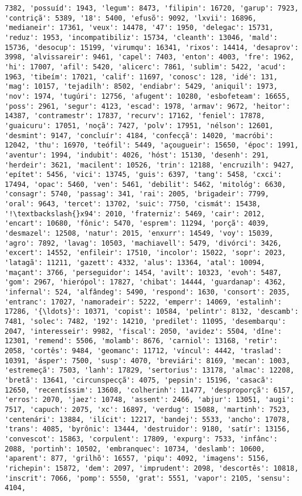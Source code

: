 \begin{Verbatim}[commandchars=\\\{\}]
7382, 'possuíd': 1943, 'legum': 8473, 'filipin': 16720, 'garup': 7923, 'contriçã': 5389, '18': 5400, 'efusõ': 9092, 'lxvii': 16896, 'medianeir': 17361, 'veux': 14478, '47': 1950, 'delegac': 15731, 'reduz': 1953, 'incompatibiliz': 15734, 'cleanth': 13046, 'mald': 15736, 'desocup': 15199, 'virumqu': 16341, 'rixos': 14414, 'desaprov': 3998, 'alvissareir': 9461, 'capel': 7403, 'enton': 4003, 'fre': 1962, 'hi': 17007, 'afil': 5420, 'alicerc': 7861, 'sublim': 5422, 'acud': 1963, 'tibeím': 17021, 'calif': 11697, 'conosc': 128, 'idé': 131, 'mag': 10157, 'tejadilh': 8502, 'endiabr': 5429, 'aniquil': 1973, 'nov': 1974, 'tugúri': 12756, 'afugent': 10280, 'esbofeteam': 16655, 'poss': 2961, 'segur': 4123, 'escad': 1978, 'armav': 9672, 'heitor': 14387, 'contramestr': 17837, 'recurv': 17162, 'feniel': 17878, 'guaicuru': 17051, 'noçã': 7427, 'polv': 17951, 'nélson': 12601, 'desmint': 9147, 'concluír': 4184, 'confecçã': 14020, 'macróbi': 12042, 'thu': 16970, 'teófil': 5449, 'açougueir': 15650, 'époc': 1991, 'aventur': 1994, 'indubit': 4026, 'hóst': 15130, 'desenh': 291, 'herdeir': 3621, 'macilent': 10526, 'trin': 12188, 'encruzilh': 9427, 'epítet': 5456, 'vici': 13745, 'guis': 6397, 'tang': 5458, 'cxci': 17494, 'opac': 5460, 'ven': 5461, 'debilit': 5462, 'mitológ': 6630, 'consagr': 5740, 'passag': 341, 'rai': 2005, 'brigadeir': 7799, 'oral': 9643, 'tercet': 13702, 'suic': 7750, 'cismát': 15438, '!\textbackslash{}x94': 2010, 'fraterniz': 5469, 'cair': 2012, 'encart': 10680, 'fônic': 5470, 'esprem': 11294, 'porçã': 4039, 'desmazel': 12508, 'natur': 2015, 'enxurr': 14549, 'voy': 15039, 'agro': 7892, 'lavag': 10503, 'machiavell': 5479, 'divórci': 3426, 'excert': 14552, 'enfileir': 17510, 'incolor': 15022, 'sopr': 2023, 'latagã': 11211, 'gazett': 4332, 'alus': 13364, 'atal': 10094, 'maçant': 3766, 'perseguidor': 1454, 'avilt': 10323, 'evoh': 5487, 'gom': 2967, 'hierópol': 17827, 'chibat': 14444, 'guardanap': 4362, 'infernal': 524, 'alfândeg': 5490, 'respond': 1630, 'consort': 2035, 'entranc': 17027, 'namoradeir': 5222, 'emperr': 14069, 'estalinh': 17286, '{\ldots}': 10371, 'copist': 10584, 'pelintr': 8132, 'descamb': 7481, 'solec': 7482, '192': 14210, 'predilet': 11095, 'desembarqu': 2047, 'interesseir': 9982, 'fiscal': 2050, 'avidez': 5504, 'dîne': 12301, 'remend': 5506, 'molamb': 8676, 'carniol': 13168, 'retir': 2058, 'cortês': 9484, 'geomanc': 11712, 'víncul': 4442, 'traslad': 10391, 'ásper': 7500, 'susp': 4070, 'breviári': 8169, 'mecan': 1003, 'estremeçã': 7503, 'lanh': 17829, 'sertorius': 13178, 'almac': 12208, 'bretã': 13641, 'circunspecçã': 4075, 'pepsin': 15196, 'casacã': 12650, 'recentíssim': 13608, 'colherinh': 11477, 'desproporçã': 6157, 'erros': 2070, 'jaez': 10748, 'assent': 2466, 'abjur': 13051, 'augi': 7517, 'capuch': 2075, 'xc': 16897, 'verdug': 15088, 'martinh': 7523, 'centenári': 13884, 'ilícit': 12217, 'bandej': 5533, 'ancho': 17078, 'trans': 4085, 'byrônic': 13444, 'destruidor': 9180, 'satír': 13156, 'convescot': 15863, 'corpulent': 17809, 'expurg': 7533, 'infânc': 2088, 'portinh': 10502, 'embranquec': 10734, 'deslamb': 10600, 'aparent': 877, 'grilhõ': 16557, 'piqu': 4092, 'imagens': 5156, 'richepin': 15872, 'dem': 2097, 'imprudent': 2098, 'descortês': 10818, 'inscrit': 7066, 'pomp': 5550, 'grat': 5551, 'vapor': 2105, 'sensu': 4104, 
\end{Verbatim}
